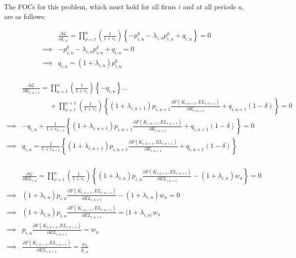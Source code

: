 \documentclass[letterpaper,12pt]{article}
\theoremstyle{definition}
\begin{document}
\begin{spacing}{1.5}
The FOCs for this problem, which must hold for all firms $i$ and at all periods $u$, are as follows:

\begin{equation}
\label{eqn:lagrange_foc_i}
\begin{split}
& \frac{\partial \mathcal{L}}{\partial I_{i,u}} = \prod_{\nu=t}^{u} \left(\frac{1}{1+r_{v}}\right) \left\{ -p^{k}_{i,u} - \lambda_{i,u}p^{k}_{i,u} + q_{i,u} \right\} = 0 \\
\implies &   -p^{k}_{i,u} - \lambda_{i,u}p^{k}_{i,u} + q_{i,u} = 0 \\
\implies & q_{i,u} = (1+\lambda_{i,u})p^{k}_{i,u} \\
\end{split}
\end{equation}


\begin{equation}
\label{eqn:lagrange_foc_k}
\begin{split}
& \frac{\partial \mathcal{L}}{\partial K_{i,u+1}} =   \prod_{\nu=t}^{u} \left(\frac{1}{1+r_{v}}\right) \left\{- q_{i,u} \right\} ... \\
& \quad\quad\quad\quad + \prod_{\nu=t}^{u+1} \left(\frac{1}{1+r_{v}}\right) \left\{(1+\lambda_{i,u+1})p_{i,u+1}\frac{\partial F(K_{i,u+1},EL_{i,u+1})}{\partial K_{i,u+1}} + q_{i,u+1}(1-\delta) \right\} = 0 \\
\implies &  - q_{i,u} + \frac{1}{1+r_{u+1}} \left\{(1+\lambda_{i,u+1})p_{i,u+1}\frac{\partial F(K_{i,u+1},EL_{i,u+1})}{\partial K_{i,u+1}}+ q_{i,u+1}(1-\delta)  \right\} = 0 \\
\implies & q_{i,u} =  \frac{1}{1+r_{u+1}} \left\{(1+\lambda_{i,u+1})p_{i,u+1}\frac{\partial F(K_{i,u+1},EL_{i,u+1})}{\partial K_{i,u+1}}+ q_{i,u+1}(1-\delta)  \right\}  \\
\end{split}
\end{equation}

\begin{equation}
\label{eqn:lagrange_foc_l}
\begin{split}
& \frac{\partial \mathcal{L}}{\partial EL_{i,u}} =   \prod_{\nu=t}^{u} \left(\frac{1}{1+r_{v}}\right) \left\{(1+\lambda_{i,u})p_{i,u}\frac{\partial F(K_{i,u+1},EL_{i,u+1})}{\partial EL_{i,u+1}} - (1+\lambda_{i,u})w_{u} \right\} = 0 \\
\implies & (1+\lambda_{i,u})p_{i,u}\frac{\partial F(K_{i,u+1},EL_{i,u+1})}{\partial EL_{i,u+1}} - (1+\lambda_{i,u})w_{u}  = 0 \\
\implies & (1+\lambda_{i,u})p_{i,u}\frac{\partial F(K_{i,u+1},EL_{i,u+1})}{\partial EL_{i,u+1}} =  (1+\lambda_{i,u)}w_{u}  \\
\implies & p_{i,u}\frac{\partial F(K_{i,u+1},EL_{i,u+1})}{\partial EL_{i,u+1}} =  w_{u}  \\
\implies &\frac{\partial F(K_{i,u+1},EL_{i,u+1})}{\partial EL_{i,u+1}} =  \frac{w_{u}}{ p_{i,u}}  \\
\end{split}
\end{equation}



\end{spacing}
\end{document}
